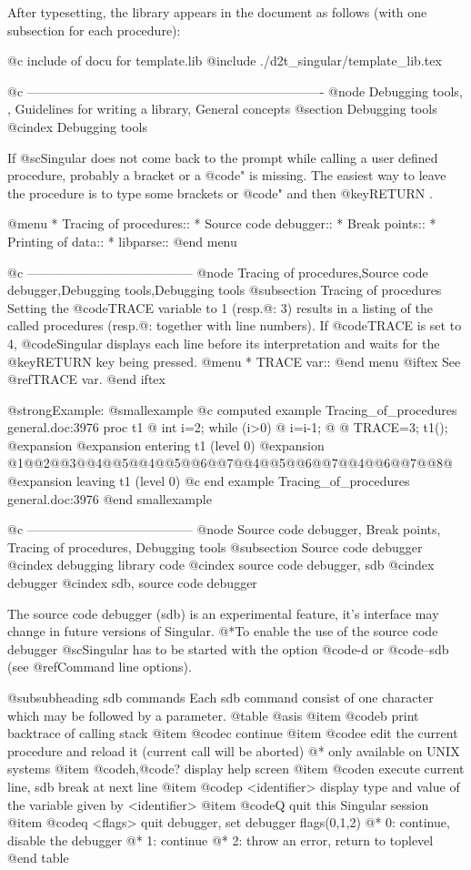 {{{After typesetting, the library appears in the document as follows (with
one subsection for each procedure):

@c include of docu for template.lib
@include ./d2t_singular/template_lib.tex

@c ----------------------------------------------------------------------
@node Debugging tools,  , Guidelines for writing a library, General concepts
@section Debugging tools
@cindex Debugging tools

If @sc{Singular} does not come back to the prompt while calling a user
defined procedure, probably a bracket or a @code{"} is missing.  The
easiest way to leave the procedure is to type some brackets or @code{"}
and then @key{RETURN} .

@menu
* Tracing of procedures::
* Source code debugger::
* Break points::
* Printing of data::
* libparse::
@end menu

@c ---------------------------------------
@node Tracing of procedures,Source code debugger,Debugging tools,Debugging tools
@subsection Tracing of procedures
Setting the @code{TRACE} variable to 1 (resp.@: 3) results in a listing of
the called procedures (resp.@: together with line numbers).
If @code{TRACE} is set to 4, @code{Singular}
displays each line before its interpretation and waits for the @key{RETURN}
key being pressed.
@menu
* TRACE var::
@end menu
@iftex
See @ref{TRACE var}.
@end iftex

@strong{Example:}
@smallexample
@c computed example Tracing_of_procedures general.doc:3976 
  proc t1
  @{
    int i=2;
    while (i>0)
    @{ i=i-1; @}
  @}
  TRACE=3;
  t1();
@expansion{} 
@expansion{} entering t1 (level 0)
@expansion{} @{1@}@{2@}@{3@}@{4@}@{5@}@{4@}@{5@}@{6@}@{7@}@{4@}@{5@}@{6@}@{7@}@{4@}@{6@}@{7@}@{8@}
@expansion{} leaving  t1 (level 0)
@c end example Tracing_of_procedures general.doc:3976
@end smallexample

@c ---------------------------------------
@node Source code debugger, Break points, Tracing of procedures, Debugging tools
@subsection Source code debugger
@cindex debugging library code
@cindex source code debugger, sdb
@cindex debugger
@cindex sdb, source code debugger


The source code debugger (sdb) is an experimental feature, it's
interface may change in future versions of Singular.  @*To enable the
use of the source code debugger @sc{Singular} has to be started with the
option @code{-d} or @code{--sdb} (see @ref{Command line options}).


@subsubheading sdb commands
Each sdb command consist of one character which may be followed by
a parameter.
@table @asis
@item @code{b}
print backtrace of calling stack
@item @code{c}
continue
@item @code{e}
edit the current procedure and reload it (current call will be aborted)
@* only available on UNIX systems
@item @code{h},@code{?}
display help screen
@item @code{n}
execute current line, sdb break at next line
@item @code{p} <identifier>
display type and value of the variable given by <identifier>
@item @code{Q}
quit this Singular session
@item @code{q} <flags>
quit debugger, set debugger flags(0,1,2)
@* 0: continue, disable the debugger
@* 1: continue
@* 2: throw an error, return to toplevel
@end table


}}}
